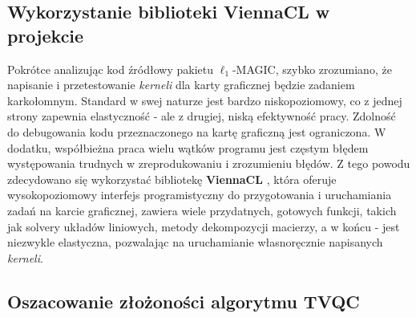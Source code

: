 \subsection{Wykorzystanie biblioteki ViennaCL w projekcie}
Pokrótce analizując kod źródłowy pakietu $\ell_1$-MAGIC, szybko zrozumiano, że napisanie i przetestowanie \textit{kerneli} dla karty graficznej będzie zadaniem karkołomnym. Standard w swej naturze jest bardzo niskopoziomowy, co z jednej strony zapewnia elastyczność - ale z drugiej, niską efektywność pracy. Zdolność do debugowania kodu przeznaczonego na kartę graficzną jest ograniczona. W dodatku, współbieżna praca wielu wątków programu jest częstym błędem występowania trudnych w zreprodukowaniu i zrozumieniu błędów. Z tego powodu zdecydowano się wykorzystać bibliotekę \textbf{ViennaCL} \cite{ViennaCL}, która oferuje wysokopoziomowy interfejs programistyczny do przygotowania i uruchamiania zadań na karcie graficznej, zawiera wiele przydatnych, gotowych funkcji, takich jak solvery układów liniowych, metody dekompozycji macierzy, a w końcu - jest niezwykle elastyczna, pozwalając na uruchamianie własnoręcznie napisanych \textit{kerneli}.

\subsection{Oszacowanie złożoności algorytmu TVQC}
